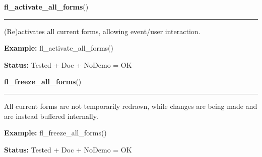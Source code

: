     \label{xformslib:library:fl_activate_all_forms}

    \vspace{0.5ex}

\hspace{.8\funcindent}\begin{boxedminipage}{\funcwidth}

    \raggedright \textbf{fl\_activate\_all\_forms}()

    \vspace{-1.5ex}

    \rule{\textwidth}{0.5\fboxrule}
\setlength{\parskip}{2ex}
    (Re)activates all current forms, allowing event/user interaction.

\setlength{\parskip}{1ex}
\textbf{Example:} fl\_activate\_all\_forms()



\textbf{Status:} Tested + Doc + NoDemo = OK



    \end{boxedminipage}

    \label{xformslib:library:fl_freeze_all_forms}

    \vspace{0.5ex}

\hspace{.8\funcindent}\begin{boxedminipage}{\funcwidth}

    \raggedright \textbf{fl\_freeze\_all\_forms}()

    \vspace{-1.5ex}

    \rule{\textwidth}{0.5\fboxrule}
\setlength{\parskip}{2ex}
    All current forms are not temporarily redrawn, while changes are being 
    made and are instead buffered internally.

\setlength{\parskip}{1ex}
\textbf{Example:} fl\_freeze\_all\_forms()



\textbf{Status:} Tested + Doc + NoDemo = OK



    \end{boxedminipage}

    \label{xformslib:library:fl_unfreeze_all_forms}

